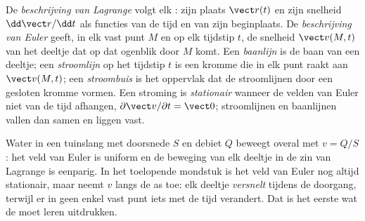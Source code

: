 \begin{definition}\label{def:b2:fluid-kinematics:euler}
De \emph{beschrijving van Lagrange} volgt elk : zijn plaats
$\vect r(t)$ en zijn snelheid $\dd\vect r/\dd t$ als functies van de tijd en
van zijn beginplaats. De \emph{beschrijving van Euler} geeft, in elk vast
punt $M$ en op elk tijdstip $t$, de snelheid $\vect v(M, t)$ van het deeltje
dat op dat ogenblik door $M$ komt. Een \emph{baanlijn} is de baan van een
deeltje; een \emph{stroomlijn} op het tijdstip $t$ is een kromme die in elk
punt raakt aan $\vect v(M, t)$; een \emph{stroombuis} is het oppervlak dat
de stroomlijnen door een gesloten kromme vormen. Een stroming is
\emph{stationair} wanneer de velden van Euler niet van de tijd afhangen,
$\partial\vect v/\partial t = \vect 0$; stroomlijnen en baanlijnen vallen
dan samen en liggen vast.
\end{definition}

\begin{example}\label{ex:b2:fluid-kinematics:hose}
Water in een tuinslang met doorsnede $S$ en debiet $Q$ beweegt overal met
$v = Q/S$: het veld van Euler is uniform en de beweging van elk deeltje in
de zin van Lagrange is eenparig. In het toelopende mondstuk is het veld van
Euler nog altijd stationair, maar neemt $v$ langs de as toe: elk deeltje
\emph{versnelt} tijdens de doorgang, terwijl er in geen enkel vast punt iets
met de tijd verandert. Dat is het eerste wat de  moet
leren uitdrukken.
\end{example}

